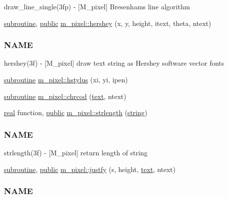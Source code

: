 \begin{DoxyCompactItemize}
\begin{DoxyCompactList}
draw\+\_\+line\+\_\+single(3fp) -\/ \mbox{[}M\+\_\+pixel\mbox{]} Bresenham\textquotesingle{}s line algorithm \end{DoxyCompactList}\item 
\hyperlink{M__stopwatch_83_8txt_acfbcff50169d691ff02d4a123ed70482}{subroutine}, \hyperlink{M__stopwatch_83_8txt_a2f74811300c361e53b430611a7d1769f}{public} \hyperlink{namespacem__pixel_a80dc3cb149287470a9837de8dd3f05bc}{m\+\_\+pixel\+::hershey} (x, y, height, itext, theta, ntext)
\begin{DoxyCompactList}\small\item\em \subsubsection*{N\+A\+ME}

hershey(3f) -\/ \mbox{[}M\+\_\+pixel\mbox{]} draw text string as Hershey software vector fonts \end{DoxyCompactList}\item 
\hyperlink{M__stopwatch_83_8txt_acfbcff50169d691ff02d4a123ed70482}{subroutine} \hyperlink{namespacem__pixel_a15c5daa9ab477991c2c6e17741cf40eb}{m\+\_\+pixel\+::hstylus} (xi, yi, ipen)
\item 
\hyperlink{M__stopwatch_83_8txt_acfbcff50169d691ff02d4a123ed70482}{subroutine} \hyperlink{namespacem__pixel_ab25c6cce708ff91a79bbabb23d591a8b}{m\+\_\+pixel\+::chrcod} (\hyperlink{notes_8txt_ad997a48ee1fbabed5333859846b5d9a3}{text}, ntext)
\item 
\hyperlink{read__watch_83_8txt_abdb62bde002f38ef75f810d3a905a823}{real} function, \hyperlink{M__stopwatch_83_8txt_a2f74811300c361e53b430611a7d1769f}{public} \hyperlink{namespacem__pixel_a0468f8d9308bade7f8f2a68a133271d2}{m\+\_\+pixel\+::strlength} (\hyperlink{what__overview_81_8txt_a74cb7e955273b9f9157b4f0c18a38849}{string})
\begin{DoxyCompactList}\small\item\em \subsubsection*{N\+A\+ME}

strlength(3f) -\/ \mbox{[}M\+\_\+pixel\mbox{]} return length of string \end{DoxyCompactList}\item 
\hyperlink{M__stopwatch_83_8txt_acfbcff50169d691ff02d4a123ed70482}{subroutine}, \hyperlink{M__stopwatch_83_8txt_a2f74811300c361e53b430611a7d1769f}{public} \hyperlink{namespacem__pixel_a7b08886c913b47694edeb60fa747afc4}{m\+\_\+pixel\+::justfy} (s, height, \hyperlink{notes_8txt_ad997a48ee1fbabed5333859846b5d9a3}{text}, ntext)
\begin{DoxyCompactList}\small\item\em \subsubsection*{N\+A\+ME}


\end{DoxyCompactList}
\end{DoxyCompactItemize}

